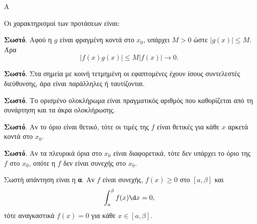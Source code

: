 \begin{thema}{Α}
\begin{erwthma}
\item {}

\item {}

\item {}

\item Οι χαρακτηρισμοί των προτάσεων είναι:
\begin{alist}
\item \textbf{Σωστό}. Αφού η $g$ είναι φραγμένη κοντά στο $x_0$, υπάρχει $M>0$ ώστε $|g(x)|\leq M$. Άρα
\[ |f(x)g(x)|\leq M|f(x)|\to0. \]
\item \textbf{Σωστό}. Στα σημεία με κοινή τετμημένη οι εφαπτομένες έχουν ίσους συντελεστές διεύθυνσης, άρα είναι παράλληλες ή ταυτίζονται.
\item \textbf{Σωστό}. Το ορισμένο ολοκλήρωμα είναι πραγματικός αριθμός που καθορίζεται από τη συνάρτηση και τα άκρα ολοκλήρωσης.
\item \textbf{Σωστό}. Αν το όριο είναι θετικό, τότε οι τιμές της $f$ είναι θετικές για κάθε $x$ αρκετά κοντά στο $x_0$.
\item \textbf{Σωστό}. Αν τα πλευρικά όρια στο $x_0$ είναι διαφορετικά, τότε δεν υπάρχει το όριο της $f$ στο $x_0$, οπότε η $f$ δεν είναι συνεχής στο $x_0$.
\end{alist}

\item Σωστή απάντηση είναι η \textbf{α}. Αν $f$ είναι συνεχής, $f(x)\geq0$ στο $[a,\beta]$ και
\[ \dint_a^\beta f(x)\d x=0, \]
τότε αναγκαστικά $f(x)=0$ για κάθε $x\in[a,\beta]$.
\end{erwthma}
\end{thema}

